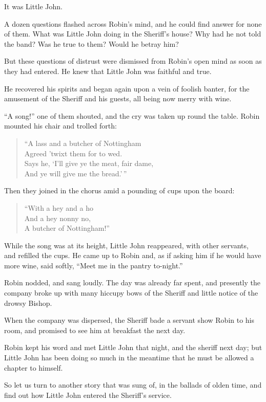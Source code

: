 It was Little John.

A dozen questions flashed across Robin's mind, and he could find answer
for none of them. What was Little John doing in the Sheriff's house? Why
had he not told the band? Was he true to them? Would he betray him?

But these questions of distrust were dismissed from Robin's open mind as
soon as they had entered. He knew that Little John was faithful and
true.

He recovered his spirits and began again upon a vein of foolish banter,
for the amusement of the Sheriff and his guests, all being now merry
with wine.

``A song!'' one of them shouted, and the cry was taken up round the
table. Robin mounted his chair and trolled forth:

\begin{quote}
``A lass and a butcher of Nottingham\\
Agreed 'twixt them for to wed.\\
Says he, `I'll give ye the meat, fair dame,\\
And ye will give me the bread.'\,''
\end{quote}

Then they joined in the chorus amid a pounding of cups upon the board:

\begin{quote}
``With a hey and a ho\\
And a hey nonny no,\\
A butcher of Nottingham!''
\end{quote}

While the song was at its height, Little John reappeared, with other
servants, and refilled the cups. He came up to Robin and, as if asking
him if he would have more wine, said softly, ``Meet me in the pantry
to-night.''

Robin nodded, and sang loudly. The day was already far spent, and
presently the company broke up with many hiccupy bows of the Sheriff and
little notice of the drowsy Bishop.

When the company was dispersed, the Sheriff bade a servant show Robin to
his room, and promised to see him at breakfast the next day.

Robin kept his word and met Little John that night, and the sheriff next
day; but Little John has been doing so much in the meantime that he must
be allowed a chapter to himself.

So let us turn to another story that was sung of, in the ballads of
olden time, and find out how Little John entered the Sheriff's service.
